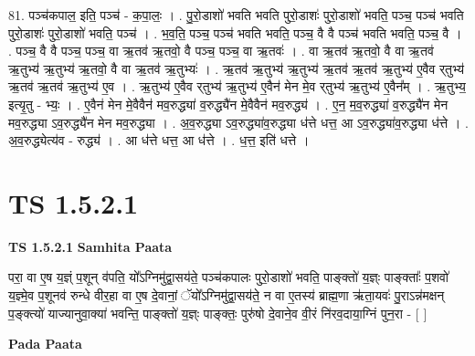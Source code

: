 \documentclass[17pt]{extarticle}
\begin{document}
81. पञ्च॑कपाल॒ इति॒ पञ्च॑ - क॒पा॒लः॒ । . पु॒रो॒डाशो॑ भवति भवति पुरो॒डाशः॑ पुरो॒डाशो॑ भवति॒ पञ्च॒ पञ्च॑ भवति पुरो॒डाशः॑ पुरो॒डाशो॑ भवति॒ पञ्च॑ । . भ॒व॒ति॒ पञ्च॒ पञ्च॑ भवति भवति॒ पञ्च॒ वै वै पञ्च॑ भवति भवति॒ पञ्च॒ वै । . पञ्च॒ वै वै पञ्च॒ पञ्च॒ वा ऋ॒तव॑ ऋ॒तवो॒ वै पञ्च॒ पञ्च॒ वा ऋ॒तवः॑ । . वा ऋ॒तव॑ ऋ॒तवो॒ वै वा ऋ॒तव॑ ऋ॒तुभ्य॑ ऋ॒तुभ्य॑ ऋ॒तवो॒ वै वा ऋ॒तव॑ ऋ॒तुभ्यः॑ । . ऋ॒तव॑ ऋ॒तुभ्य॑ ऋ॒तुभ्य॑ ऋ॒तव॑ ऋ॒तव॑ ऋ॒तुभ्य॑ ए॒वैव र्‌तुभ्य॑ ऋ॒तव॑ ऋ॒तव॑ ऋ॒तुभ्य॑ ए॒व । . ऋ॒तुभ्य॑ ए॒वैव र्‌तुभ्य॑ ऋ॒तुभ्य॑ ए॒वैन॑ मेन मे॒व र्‌तुभ्य॑ ऋ॒तुभ्य॑ ए॒वैन᳚म् । . ऋ॒तुभ्य॒ इत्यृ॒तु - भ्यः॒ । . ए॒वैन॑ मेन मे॒वैवैन॑ मव॒रुद्ध्या॑ व॒रुद्ध्यै॑न मे॒वैवैन॑ मव॒रुद्ध्य॑ । . ए॒न॒ म॒व॒रुद्ध्या॑ व॒रुद्ध्यै॑न मेन मव॒रुद्ध्या ऽव॒रुद्ध्यै॑न मेन मव॒रुद्ध्या । . अ॒व॒रुद्ध्या ऽव॒रुद्ध्या॑व॒रुद्ध्या ध॑त्ते धत्त॒ आ ऽव॒रुद्ध्या॑व॒रुद्ध्या ध॑त्ते । . अ॒व॒रुद्ध्येत्य॑व - रुद्ध्य॑ । . आ ध॑त्ते धत्त॒ आ ध॑त्ते । . ध॒त्त॒ इति॑ धत्ते । \newline
\pagebreak
{}

\section{ TS 1.5.2.1 }

\textbf{TS 1.5.2.1 } \newline
\textbf{Samhita Paata} \newline

परा॒ वा ए॒ष य॒ज्ञ्ं प॒शून् व॑पति॒ यो᳚ऽग्निमु॑द्वा॒सय॑ते॒ पञ्च॑कपालः पुरो॒डाशो॑ भवति॒ पाङ्क्तो॑ य॒ज्ञ्ः पाङ्क्ताः᳚ प॒शवो॑ य॒ज्ञ्मे॒व प॒शूनव॑ रुन्धे वीर॒हा वा ए॒ष दे॒वानां॒ ॅयो᳚ऽग्निमु॑द्वा॒सय॑ते॒ न वा ए॒तस्य॑ ब्राह्म॒णा ऋ॑ता॒यवः॑ पु॒राऽन्न॑मक्षन् प॒ङ्क्त्यो॑ याज्यानुवा॒क्या॑ भवन्ति॒ पाङ्क्तो॑ य॒ज्ञ्ः पाङ्क्तः॒ पुरु॑षो दे॒वाने॒व वी॒रं नि॑रव॒दाया॒ग्निं पुन॒रा - [ ] \newline

\textbf{Pada Paata} \newline
\end{document}
